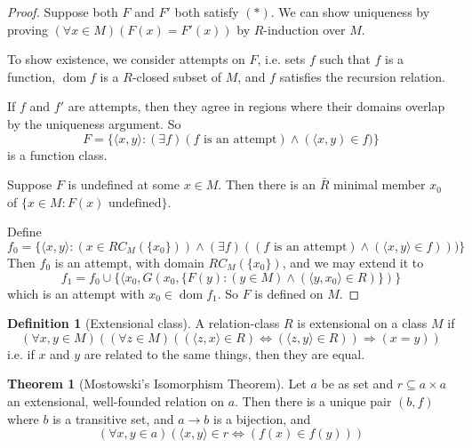 \documentclass[a4paper]{article}
\theoremstyle{definition}
\newtheorem*{thm}{Theorem}
\newtheorem*{defi}{Definition}
\newcommand{\bra}{\langle}
\newcommand{\ket}{\rangle}
\DeclareMathOperator\dom{dom}
\begin{document}
\begin{proof}
  Suppose both $F$ and $F'$ both satisfy $(*)$. We can show uniqueness by proving $(\forall x\in M)(F(x) = F'(x))$ by $R$-induction over $M$.

  To show existence, we consider attempts on $F$, i.e. sets $f$ such that $f$ is a function, $\dom f$ is a $R$-closed subset of $M$, and $f$ satisfies the recursion relation.

  If $f$ and $f'$ are attempts, then they agree in regions where their domains overlap by the uniqueness argument. So
  \[
  F = \{\bra x, y\ket : (\exists f)(f\text{ is an attempt}) \wedge (\bra x, y)\in f)\}
  \]
  is a function class.

Suppose $F$ is undefined at some $x\in M$. Then there is an $\bar R$ minimal member $x_0$ of $\{x\in M: F(x)\text{ undefined}\}$.

Define 
\[
f_0 = \{\bra x, y\ket: (x\in RC_M(\{x_0\}))\wedge (\exists f)((f\text{ is an attempt})\wedge (\bra x, y\ket\in f)))\}
\]
Then $f_0$ is an attempt, with domain $RC_M(\{x_0\})$, and we may extend it to
\[
f_1 = f_0\cup \{\bra x_0, G(x_0, \{F(y):(y\in M)\wedge (\bra y, x_0\ket\in R)\})\}
\]
which is an attempt with $x_0\in \dom f_1$. So $F$ is defined on $M$.
\end{proof}

\begin{defi}[Extensional class]
  A relation-class $R$ is extensional on a class $M$ if
  \[
  (\forall x, y\in M)((\forall z\in M)((\bra z, x\ket \in R)\Leftrightarrow (\bra z, y\ket \in R))\Rightarrow (x = y))
  \]
  i.e. if $x$ and $y$ are related to the same things, then they are equal.
\end{defi}

\begin{thm}[Mostowski's Isomorphism Theorem]
  Let $a$ be as set and $r\subseteq a\times a$ an extensional, well-founded relation on $a$. Then there is a unique pair $(b, f)$ where $b$ is a transitive set, and $a\to b$ is a bijection, and
  \[
  (\forall x, y\in a)(\bra x, y\ket \in r\Leftrightarrow (f(x)\in f(y)))
  \]
\end{thm}
\end{document}
